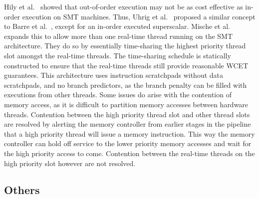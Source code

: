 Hily et al.~\cite{Hily1999} showed that out-of-order execution may not be as cost effective as in-order execution on SMT machines.
Thus, Uhrig et al.~\cite{SaschaUhrig2005SMT} proposed a similar concept to Barre et al.~\cite{Barre2008RTSMT}, except for an in-order executed superscalar.
Mische et al.\cite{Mische2008SMT} expands this to allow more than one real-time thread running on the SMT architecture.
They do so by essentially time-sharing the highest priority thread slot amongst the real-time threads.  
The time-sharing schedule is statically constructed to ensure that the real-time threads still provide reasonable WCET guarantees. 
This architecture uses instruction scratchpads without data scratchpads, and no branch predictors, as the branch penalty can be filled with executions from other threads.   
Some issues do arise with the contention of memory access, as it is difficult to partition memory accesses between hardware threads.
Contention between the high priority thread slot and other thread slots are resolved by alerting the memory controller from earlier stages in the pipeline that a high priority thread will issue a memory instruction. 
This way the memory controller can hold off service to the lower priority memory accesses and wait for the high priority access to come.     
Contention between the real-time threads on the high priority slot however are not resolved. 
 

\subsection{Others}
